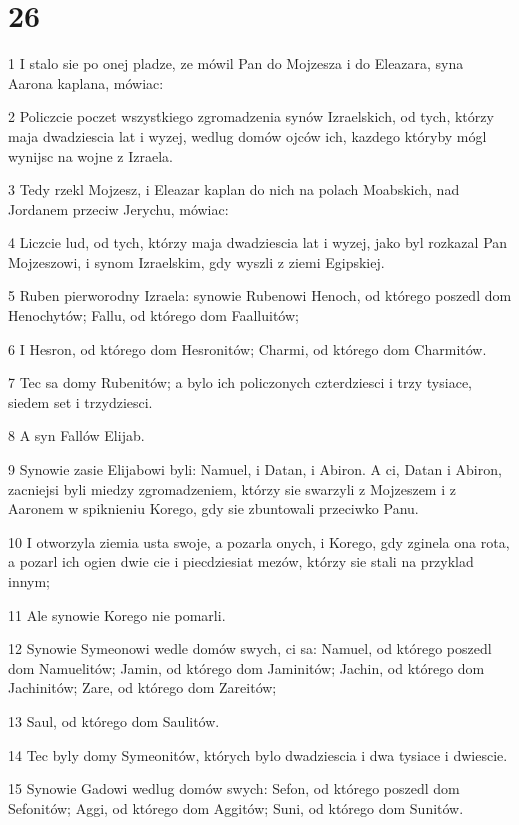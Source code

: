 \chapter{26}

\par 1 I stalo sie po onej pladze, ze mówil Pan do Mojzesza i do Eleazara, syna Aarona kaplana, mówiac:
\par 2 Policzcie poczet wszystkiego zgromadzenia synów Izraelskich, od tych, którzy maja dwadziescia lat i wyzej, wedlug domów ojców ich, kazdego któryby mógl wynijsc na wojne z Izraela.
\par 3 Tedy rzekl Mojzesz, i Eleazar kaplan do nich na polach Moabskich, nad Jordanem przeciw Jerychu, mówiac:
\par 4 Liczcie lud, od tych, którzy maja dwadziescia lat i wyzej, jako byl rozkazal Pan Mojzeszowi, i synom Izraelskim, gdy wyszli z ziemi Egipskiej.
\par 5 Ruben pierworodny Izraela: synowie Rubenowi Henoch, od którego poszedl dom Henochytów; Fallu, od którego dom Faalluitów;
\par 6 I Hesron, od którego dom Hesronitów; Charmi, od którego dom Charmitów.
\par 7 Tec sa domy Rubenitów; a bylo ich policzonych czterdziesci i trzy tysiace, siedem set i trzydziesci.
\par 8 A syn Fallów Elijab.
\par 9 Synowie zasie Elijabowi byli: Namuel, i Datan, i Abiron. A ci, Datan i Abiron, zacniejsi byli miedzy zgromadzeniem, którzy sie swarzyli z Mojzeszem i z Aaronem w spiknieniu Korego, gdy sie zbuntowali przeciwko Panu.
\par 10 I otworzyla ziemia usta swoje, a pozarla onych, i Korego, gdy zginela ona rota, a pozarl ich ogien dwie cie i piecdziesiat mezów, którzy sie stali na przyklad innym;
\par 11 Ale synowie Korego nie pomarli.
\par 12 Synowie Symeonowi wedle domów swych, ci sa: Namuel, od którego poszedl dom Namuelitów; Jamin, od którego dom Jaminitów; Jachin, od którego dom Jachinitów; Zare, od którego dom Zareitów;
\par 13 Saul, od którego dom Saulitów.
\par 14 Tec byly domy Symeonitów, których bylo dwadziescia i dwa tysiace i dwiescie.
\par 15 Synowie Gadowi wedlug domów swych: Sefon, od którego poszedl dom Sefonitów; Aggi, od którego dom Aggitów; Suni, od którego dom Sunitów.
